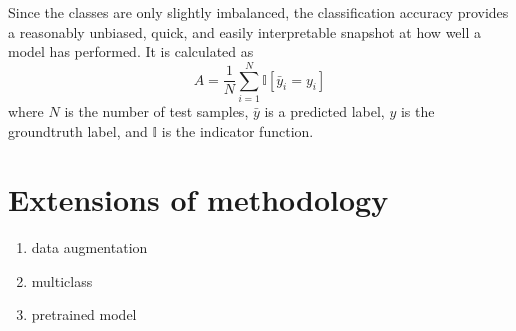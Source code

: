 Since the classes are only slightly imbalanced, the classification accuracy
provides a reasonably unbiased, quick, and easily interpretable snapshot at how
well a model has performed. It is calculated as
\begin{equation}
A = \frac{1}{N}\sum_{i=1}^{N} \mathbb{I}[\bar{y}_i = y_i]
\end{equation}
where $N$ is the number of test samples, $\bar{y}$ is a predicted label, $y$
is the groundtruth label, and $\mathbb{I}$ is the indicator function.

\section{Extensions of methodology}

\begin{enumerate}

  \item data augmentation

  \item multiclass

  \item pretrained model

\end{enumerate}
